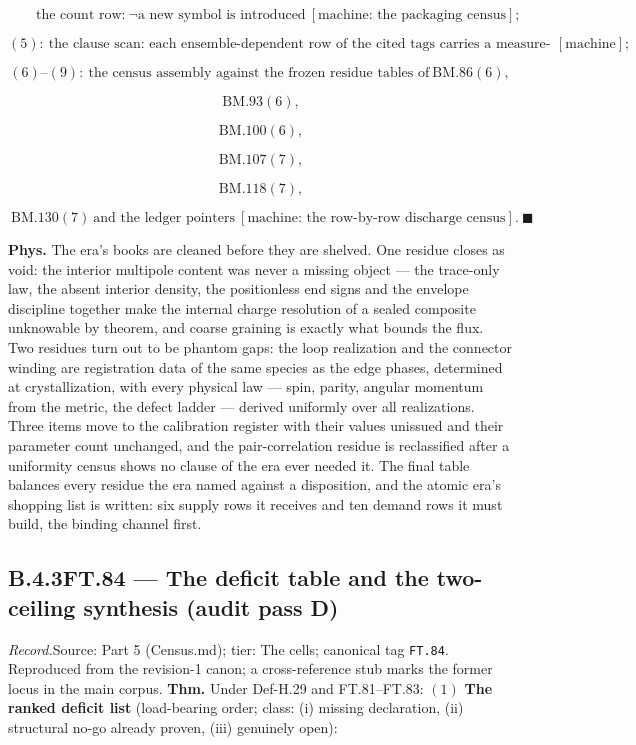 \documentclass[11pt,openany]{report}
\theoremstyle{canonplain}
\theoremstyle{canondef}
\begin{document}
\[
\qquad \text{the count row:}\ \neg\text{a new symbol is introduced}\ [\text{machine: the packaging census}];
\]

\[
(5):\ \text{the clause scan: each ensemble-dependent row of the cited tags carries a measure-free bound, a uniformity clause, or the marked specialization}\ [\text{machine}];
\]

\[
(6)\text{--}(9):\ \text{the census assembly against the frozen residue tables of}\ \mathrm{BM.86}(6),
\]

\[
\ \mathrm{BM.93}(6),
\]

\[
\ \mathrm{BM.100}(6),
\]

\[
\ \mathrm{BM.107}(7),
\]

\[
\ \mathrm{BM.118}(7),
\]

\[
\ \mathrm{BM.130}(7)\ \text{and the ledger pointers}\ [\text{machine: the row-by-row discharge census}].\ \blacksquare
\]

\textbf{Phys.} The era's books are cleaned before they are shelved. One residue closes as void: the interior multipole content was never a missing object — the trace-only law, the absent interior density, the positionless end signs and the envelope discipline together make the internal charge resolution of a sealed composite unknowable by theorem, and coarse graining is exactly what bounds the flux. Two residues turn out to be phantom gaps: the loop realization and the connector winding are registration data of the same species as the edge phases, determined at crystallization, with every physical law — spin, parity, angular momentum from the metric, the defect ladder — derived uniformly over all realizations. Three items move to the calibration register with their values unissued and their parameter count unchanged, and the pair-correlation residue is reclassified after a uniformity census shows no clause of the era ever needed it. The final table balances every residue the era named against a disposition, and the atomic era's shopping list is written: six supply rows it receives and ten demand rows it must build, the binding channel first.

\medskip
\subsection*{\texorpdfstring{B.4.3\quad FT.84 — The deficit table and the two-ceiling synthesis (audit pass D)}{FT.84 B.4.3}}
\label{tag:FT-84}
{\small \textit{Record.}\quad Source: Part 5 (Census.md); tier: The cells; canonical tag \texttt{FT.84}. Reproduced from the revision-1 canon; a cross-reference stub marks the former locus in the main corpus.}
\medskip
\textbf{Thm.} Under Def-H.29 and FT.81–FT.83: $(1)$ \textbf{The ranked deficit list} (load-bearing order; class: (i) missing declaration, (ii) structural no-go already proven, (iii) genuinely open):
\end{document}
